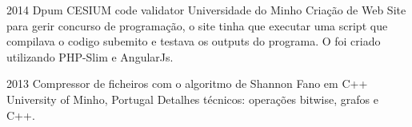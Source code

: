 \documentclass[]{friggeri-cv} %
\begin{document}
\begin{entrylist}
\entry
{2014}
{Dpum CESIUM code validator}
{Universidade do Minho}
{Criação de Web Site para gerir concurso de programação, o site tinha que executar uma script que compilava o codigo subemito e testava os outputs do programa. O foi criado utilizando PHP-Slim e AngularJs.}



\entry
{2013}
{Compressor de ficheiros com o algoritmo de Shannon Fano em C++}
{University of Minho, Portugal}
{Detalhes técnicos: operações bitwise, grafos e C++.
}
\end{entrylist}
\end{document}
